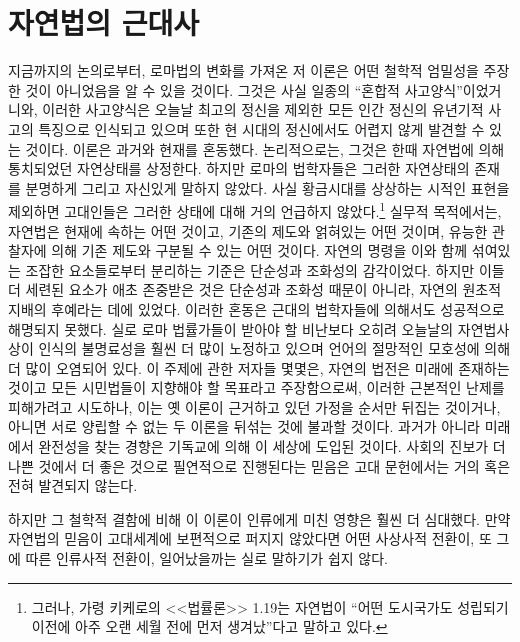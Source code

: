 \chapter{자연법의 근대사}

지금까지의 논의로부터, 로마법의 변화를 가져온 저 이론은 어떤 철학적 엄밀성을
주장한 것이 아니었음을 알 수 있을 것이다.
그것은 사실 일종의 ``혼합적 사고양식''이었거니와,
이러한 사고양식은 오늘날 최고의 정신을 제외한 모든 인간 정신의 유년기적 사고의
특징으로 인식되고 있으며 또한 현 시대의 정신에서도 어렵지 않게
발견할 수 있는 것이다.
 이론은 과거와 현재를 혼동했다.
논리적으로는, 그것은 한때 자연법에 의해 통치되었던 자연상태를 상정한다.
하지만 로마의 법학자들은 그러한 자연상태의 존재를 분명하게 그리고
자신있게 말하지 않았다. 사실 황금시대를 상상하는 시적인 표현을
제외하면 고대인들은 그러한 상태에 대해 거의 언급하지 않았다.\footnote{%
  그러나, 가령 키케로의 <<법률론>> 1.19는 자연법이
  ``어떤 도시국가도 성립되기 이전에 아주 오랜 세월 전에 먼저
  생겨났''다고 말하고 있다. }
실무적 목적에서는, 자연법은 현재에 속하는 어떤 것이고,
기존의 제도와 얽혀있는 어떤 것이며, 유능한 관찰자에 의해
기존 제도와 구분될 수 있는 어떤 것이다.
자연의 명령을 이와 함께 섞여있는 조잡한 요소들로부터 분리하는 기준은
단순성과 조화성의 감각이었다.
하지만 이들 더 세련된 요소가 애초 존중받은 것은
단순성과 조화성 때문이 아니라,
자연의 원초적 지배의 후예라는 데에 있었다.
이러한 혼동은 근대의 법학자들에 의해서도 성공적으로 해명되지 못했다.
실로
로마 법률가들이 받아야 할 비난보다 오히려
오늘날의 자연법사상이 인식의 불명료성을 훨씬 더 많이 노정하고 있으며
언어의 절망적인 모호성에 의해 더 많이 오염되어 있다.
이 주제에 관한 저자들 몇몇은, 자연의 법전은 미래에 존재하는 것이고
모든 시민법들이 지향해야 할 목표라고 주장함으로써,
이러한 근본적인 난제를 피해가려고 시도하나,
이는 옛 이론이 근거하고 있던 가정을 순서만 뒤집는 것이거나,
아니면 서로 양립할 수 없는 두 이론을 뒤섞는 것에 불과할 것이다.
과거가 아니라 미래에서 완전성을 찾는 경향은 기독교에 의해
이 세상에 도입된 것이다.
사회의 진보가 더 나쁜 것에서 더 좋은 것으로 필연적으로 진행된다는 믿음은
고대 문헌에서는 거의 혹은 전혀 발견되지 않는다.

하지만 그 철학적 결함에 비해 이 이론이 인류에게 미친 영향은 훨씬 더 심대했다.
만약 자연법의 믿음이 고대세계에 보편적으로 퍼지지 않았다면
어떤 사상사적 전환이, 또 그에 따른 인류사적 전환이, 일어났을까는
실로 말하기가 쉽지 않다.

